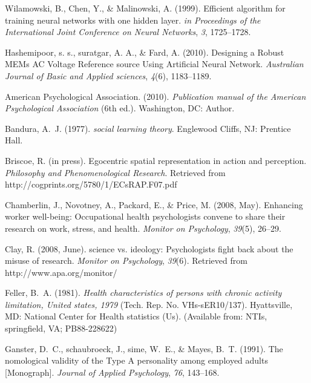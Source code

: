 \documentclass[]{interact}
\theoremstyle{plain}%
\theoremstyle{definition}
\theoremstyle{remark}
\begin{document}
\begin{thebibliography}{}

Wilamowski, B., Chen, Y.,  \&  Malinowski, A. (1999).  Efficient algorithm for training neural networks with one hidden layer. \emph{ in Proceedings of the International Joint Conference on Neural Networks}, \emph{3}, 1725--1728.

Hashemipoor, s. s., suratgar, A. A.,  \&  Fard, A. (2010).  Designing a Robust MEMs AC Voltage Reference source Using Artificial Neural Network. \emph{ Australian Journal of Basic and Applied sciences}, \emph{4}(6), 1183--1189.


American Psychological Association. (2010). \emph {Publication manual of the
 American Psychological Association} (6th ed.). Washington, DC: Author.

Bandura, A.~J. (1977). \emph{social learning theory}. Englewood Cliffs, NJ:
 Prentice Hall.
 

 

Briscoe, R. (in press). {Egocentric spatial representation in action and
 perception}. \emph{Philosophy and Phenomenological Research}. Retrieved from
 http://cogprints.org/5780/1/ECsRAP.F07.pdf

Chamberlin, J., Novotney, A., Packard, E., \& Price, M. (2008, May).
 Enhancing worker well-being: Occupational health psychologists convene to
 share their research on work, stress, and health. \emph{Monitor on
 Psychology}, \emph{39}(5), 26--29.

Clay, R. (2008, June). science vs. ideology: Psychologists fight back about the
 misuse of research. \emph{Monitor on Psychology}, \emph{39}(6). Retrieved from
 http://www.apa.org/monitor/

Feller, B.~A. (1981). \emph{Health characteristics of persons with chronic
 activity limitation, United states, 1979} (Tech. Rep. No. VHs-sER10/137).
 Hyattsville, MD: National Center for Health statistics (Us). (Available from:
 NTIs, springfield, VA; PB88-228622)

Ganster, D.~C., schaubroeck, J., sime, W.~E., \& Mayes, B.~T. (1991).
 The nomological validity of the Type A personality among employed adults
 [Monograph]. \emph{Journal of Applied Psychology}, \emph{76}, 143--168.


\end{thebibliography}
\end{document}
